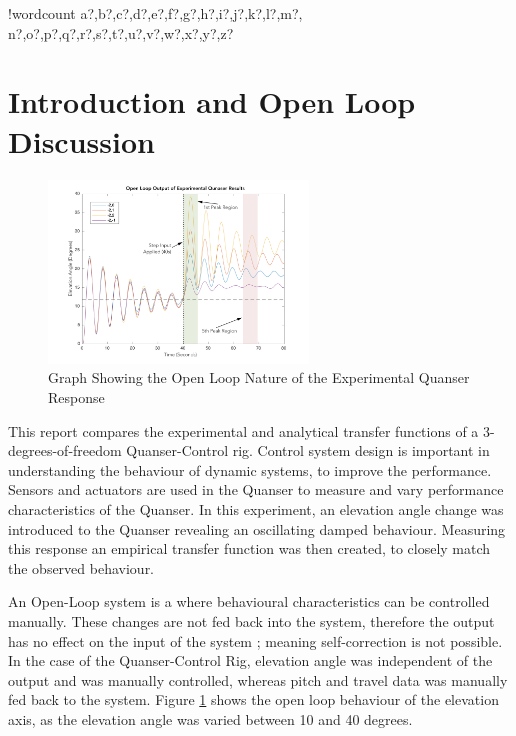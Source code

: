 \documentclass[11pt]{article}
\newcounter{words}
\newenvironment{counted}{%
  \setcounter{words}{0}
  \SearchList!{wordcount}{\stepcounter{words}}
    {a?,b?,c?,d?,e?,f?,g?,h?,i?,j?,k?,l?,m?,
    n?,o?,p?,q?,r?,s?,t?,u?,v?,w?,x?,y?,z?}
  \UndoBoundary{'}
  \SearchOrder{p;}}{%
  \StopSearching}
\begin{document}
\clearpage
{}
\begin{counted} %
\section{Introduction and Open Loop
Discussion}\label{introduction-and-open-loop-discussion}

\begin{figure}
  \begin{center}
  \vspace{-20pt}
  \includegraphics[trim = 150 60 180 20, clip, width=0.615\textwidth]{intrograph.pdf}
  \end{center}
  \caption{Graph Showing the Open Loop Nature of the Experimental Quanser Response}
  \label{intrograph}
  \vspace{-15pt}
\end{figure}

This report compares the experimental and analytical transfer functions
of a 3-degrees-of-freedom Quanser-Control rig. Control system design is
important in understanding the behaviour of dynamic systems, to improve
the performance. Sensors and actuators are used in the Quanser to
measure and vary performance characteristics of the Quanser. In this
experiment, an elevation angle change was introduced to the Quanser
revealing an oscillating damped behaviour. Measuring this response an
empirical transfer function was then created, to closely match the
observed behaviour.

An Open-Loop system is a where behavioural characteristics can be
controlled manually. These changes are not fed back into the system,
therefore the output has no effect on the input of the system
\cite{openloop}; meaning self-correction is not possible. In the case of
the Quanser-Control Rig, elevation angle was independent of the output
and was manually controlled, whereas pitch and travel data was manually
fed back to the system. Figure \ref{intrograph} shows the open loop
behaviour of the elevation axis, as the elevation angle was varied
between 10 and 40 degrees.


\end{counted}
\end{document}
